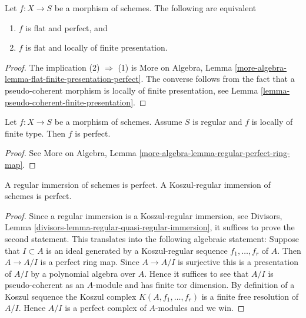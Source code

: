 \begin{lemma}
\label{lemma-flat-finite-presentation-perfect}
Let $f : X \to S$ be a morphism of schemes.
The following are equivalent
\begin{enumerate}
\item $f$ is flat and perfect, and
\item $f$ is flat and locally of finite presentation.
\end{enumerate}
\end{lemma}

\begin{proof}
The implication (2) $\Rightarrow$ (1) is
More on Algebra,
Lemma \ref{more-algebra-lemma-flat-finite-presentation-perfect}.
The converse follows from the fact that a pseudo-coherent morphism
is locally of finite presentation, see
Lemma \ref{lemma-pseudo-coherent-finite-presentation}.
\end{proof}

\begin{lemma}
\label{lemma-regular-target-perfect}
Let $f : X \to S$ be a morphism of schemes.
Assume $S$ is regular and $f$ is locally of finite type.
Then $f$ is perfect.
\end{lemma}

\begin{proof}
See
More on Algebra, Lemma \ref{more-algebra-lemma-regular-perfect-ring-map}.
\end{proof}

\begin{lemma}
\label{lemma-regular-immersion-perfect}
A regular immersion of schemes is perfect.
A Koszul-regular immersion of schemes is perfect.
\end{lemma}

\begin{proof}
Since a regular immersion is a Koszul-regular immersion, see
Divisors, Lemma \ref{divisors-lemma-regular-quasi-regular-immersion},
it suffices to prove the second statement. This translates into the
following algebraic statement: Suppose that $I \subset A$ is an
ideal generated by a Koszul-regular sequence $f_1, \ldots, f_r$ of $A$.
Then $A \to A/I$ is a perfect ring map. Since $A \to A/I$ is surjective
this is a presentation of $A/I$ by a polynomial algebra over $A$.
Hence it suffices to see that $A/I$ is pseudo-coherent as an $A$-module
and has finite tor dimension. By definition of a Koszul sequence
the Koszul complex $K(A, f_1, \ldots, f_r)$ is a finite free resolution
of $A/I$. Hence $A/I$ is a perfect complex of $A$-modules and we win.
\end{proof}

